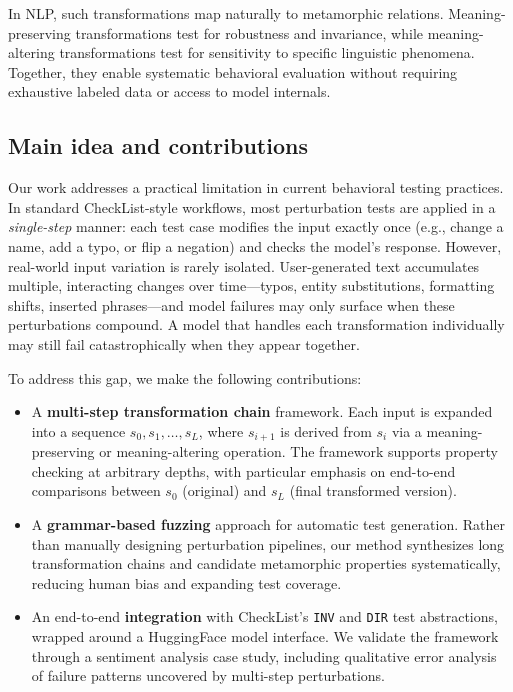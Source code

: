 \documentclass[11pt]{article}
\begin{document}
In NLP, such transformations map naturally to metamorphic relations. Meaning-preserving transformations test for robustness and invariance, while meaning-altering transformations test for sensitivity to specific linguistic phenomena. Together, they enable systematic behavioral evaluation without requiring exhaustive labeled data or access to model internals.

\subsection{Main idea and contributions}

Our work addresses a practical limitation in current behavioral testing practices. In standard CheckList-style workflows, most perturbation tests are applied in a \emph{single-step} manner: each test case modifies the input exactly once (e.g., change a name, add a typo, or flip a negation) and checks the model's response. However, real-world input variation is rarely isolated. User-generated text accumulates multiple, interacting changes over time—typos, entity substitutions, formatting shifts, inserted phrases—and model failures may only surface when these perturbations compound. A model that handles each transformation individually may still fail catastrophically when they appear together.

To address this gap, we make the following contributions:
\begin{itemize}
    \item A \textbf{multi-step transformation chain} framework. Each input is expanded into a sequence $s_0, s_1, \dots, s_L$, where $s_{i+1}$ is derived from $s_i$ via a meaning-preserving or meaning-altering operation. The framework supports property checking at arbitrary depths, with particular emphasis on end-to-end comparisons between $s_0$ (original) and $s_L$ (final transformed version).
    
    \item A \textbf{grammar-based fuzzing} approach for automatic test generation. Rather than manually designing perturbation pipelines, our method synthesizes long transformation chains and candidate metamorphic properties systematically, reducing human bias and expanding test coverage.
    
    \item An end-to-end \textbf{integration} with CheckList's \texttt{INV} and \texttt{DIR} test abstractions, wrapped around a HuggingFace model interface. We validate the framework through a sentiment analysis case study, including qualitative error analysis of failure patterns uncovered by multi-step perturbations.
\end{itemize}
\end{document}
